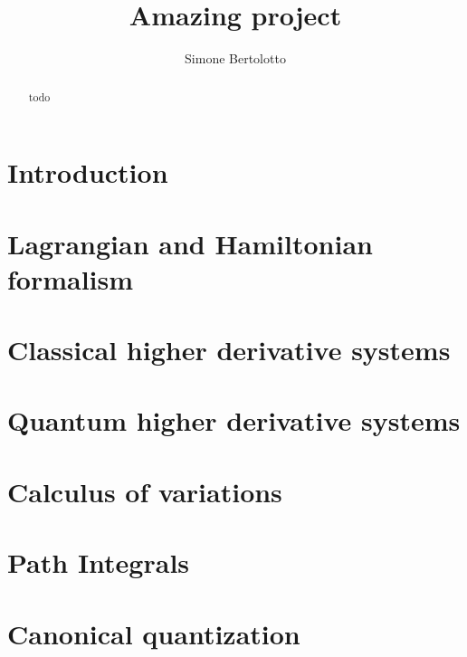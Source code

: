 \documentclass[a4paper]{article}
\title{Amazing project}
\author{Simone Bertolotto}
\theoremstyle{definition}
\numberwithin{equation}{section}
\begin{document}
  \maketitle

  \begin{abstract}
    todo
  \end{abstract}

  \newpage

  \section{Introduction}
  \label{section: introduction}
  

  \section{Lagrangian and Hamiltonian formalism}
  \label{section: lagrangin and hamiltonian formalism}
  

  \section{Classical higher derivative systems}
  \label{section: classical higher derivative systems}
  

  \section{Quantum higher derivative systems}
  \label{section: quantum higher derivative systems}
  

  \newpage
  \begin{appendices}
    \section{Calculus of variations}
    \label{appendix: calculus of variation}
    

    \section{Path Integrals}
    \label{appendix:path_integrals}
    

    \section{Canonical quantization}
    \label{appendix:canonical_quantization}
    
  \end{appendices}

  \newpage

  \printbibliography
\end{document}
